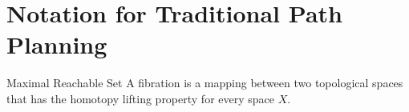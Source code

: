 % 
% 
% 
% 
% 
% 
% 

\section{Notation for Traditional Path Planning}

\theoremstyle{definition}
\begin{definition}{Maximal Reachable Set}
A fibration is a mapping between two topological spaces that has the homotopy lifting property for every space $X$.
\end{definition}

